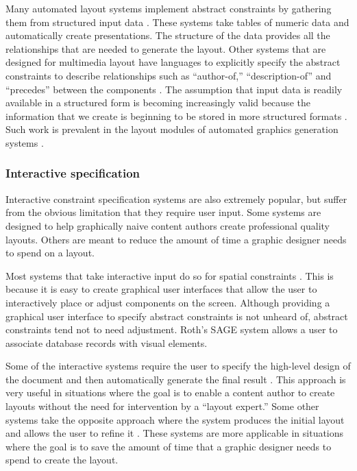     Many automated layout systems implement abstract constraints by gathering them from structured input data \citep{mackinlay-1,casner-1,borning-1,beach-1}. These systems take tables of numeric data and automatically create presentations. The structure of the data provides all the relationships that are needed to generate the layout. Other systems that are designed for multimedia layout have languages to explicitly specify the abstract constraints to describe relationships such as “author-of,” “description-of” and “precedes” between the components \citep{weitzman-2,graf-1}. The assumption that input data is readily available in a structured form is becoming increasingly valid because the information that we create is beginning to be stored in more structured formats \citep{bray-1}. Such work is prevalent in the layout modules of automated graphics generation systems \citep{zhou-2}.

    \subsubsection{Interactive specification}

    Interactive constraint specification systems are also extremely popular, but suffer from the obvious limitation that they require user input. Some systems are designed to help graphically naive content authors create professional quality layouts. Others are meant to reduce the amount of time a graphic designer needs to spend on a layout.

    Most systems that take interactive input do so for spatial constraints \citep{singh-2,hudson-2,borning-1}. This is because it is easy to create graphical user interfaces that allow the user to interactively place or adjust components on the screen. Although providing a graphical user interface to specify abstract constraints is not unheard of, abstract constraints tend not to need adjustment. Roth’s SAGE system \citep{roth-1} allows a user to associate database records with visual elements.

    Some of the interactive systems require the user to specify the high-level design of the document and then automatically generate the final result \citep{kim-1}. This approach is very useful in situations where the goal is to enable a content author to create layouts without the need for intervention by a “layout expert.” Some other systems take the opposite approach where the system produces the initial layout and allows the user to refine it \citep{singh-1}. These systems are more applicable in situations where the goal is to save the amount of time that a graphic designer needs to spend to create the layout.


